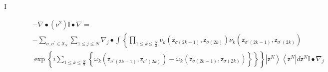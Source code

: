\documentclass[aps,preprint]{revtex4}%
\begin{document}
\begin{description}
\item[I]
\begin{align}
&  -\nabla\bullet\left(  \nu^{2}\right)  \mathbb{I}\bullet\nabla\left.
=\right. \nonumber\\
&  -%
{\displaystyle\sum\limits_{\sigma,\sigma^{\prime}\in\mathcal{S}_{N}}}
{\displaystyle\sum\limits_{1\leq j\leq N}}
\nabla_{j}\bullet\int\left\{
{\displaystyle\prod\limits_{1\leq k\leq\frac{N}{2}}}
\nu_{k}\left(  \mathsf{z}_{\sigma\left(  2k-1\right)  },\mathsf{z}%
_{\sigma\left(  2k\right)  }\right)  \nu_{k}\left(  \mathsf{z}_{\sigma
^{\prime}\left(  2k-1\right)  },\mathsf{z}_{\sigma^{\prime}\left(  2k\right)
}\right)  \right. \nonumber\\
&  \left.  \exp\left\{  i%
{\displaystyle\sum\limits_{1\leq k\leq\frac{N}{2}}}
\left\{  \omega_{k}\left(  \mathsf{z}_{\sigma^{\prime}\left(  2k-1\right)
},\mathsf{z}_{\sigma^{\prime}\left(  2k\right)  }\right)  -\omega_{k}\left(
\mathsf{z}_{\sigma\left(  2k-1\right)  },\mathsf{z}_{\sigma\left(  2k\right)
}\right)  \right\}  \right\}  \right\}  \left\vert \mathsf{z}^{N}\right\rangle
\left\langle \mathsf{z}^{N}\right\vert d\mathsf{z}^{N}\mathbb{I}\bullet
\nabla_{j}%
\end{align}



\end{description}
\end{document}
